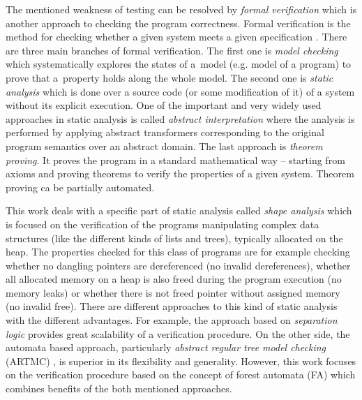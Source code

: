 \documentclass[fleqn,11pt]{ExcelAtFIT} %
\begin{document}
The mentioned weakness of testing can be resolved by \emph{formal verification}
which is another approach to checking the program correctness.
Formal verification is the method for checking whether a given system meets a given specification \cite{fav:lecture}.
There are three main branches of formal verification.
The first one is \emph{model checking} which systematically explores the states of a~model (e.g. model of a program) to
prove that a~property holds along the whole model.
The second one is \emph{static analysis} which is done over a source code (or some modification of it) of a system
without its explicit execution.
One of the important and very widely used approaches in static analysis is called \emph{abstract interpretation} where the analysis is performed by
applying abstract transformers corresponding to the original program semantics over an abstract domain.
The last approach is \emph{theorem proving}.
It proves the program in a standard mathematical way -- starting from axioms and proving theorems to
verify the properties of a given system.
Theorem proving ca be partially automated.

This work deals with a specific part of static analysis called \emph{shape analysis} which is focused on the verification of the programs manipulating
complex data structures (like the different kinds of lists and trees), typically allocated on the heap.
The properties checked for this class of programs are for example checking whether no dangling
pointers are dereferenced (no invalid dereferences), whether all allocated memory on a heap is also freed
during the program execution (no memory leaks) or whether there is not freed pointer without assigned memory (no invalid free).
There are different approaches to this kind of static analysis with the different advantages.
For example, the approach based on \emph{separation logic} \cite{seplog,seplog07} provides great scalability of a verification procedure.
On the other side, the automata based approach, particularly \emph{abstract regular tree model checking} (ARTMC) \cite{artmc}, is
superior in its flexibility and generality.
However, this work focuses on the verification procedure based on the concept of forest automata (FA) which
combines benefits of the both mentioned approaches.
\end{document}
